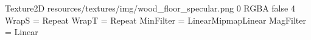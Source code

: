 Texture2D
resources/textures/img/wood_floor_specular.png
0
RGBA
false
4
WrapS = Repeat
WrapT = Repeat
MinFilter = LinearMipmapLinear
MagFilter = Linear
